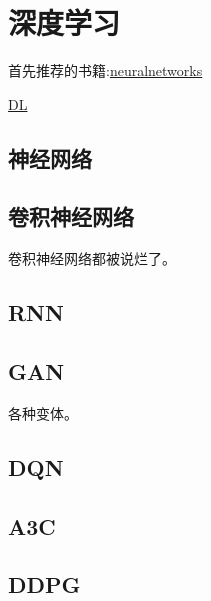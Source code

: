 \chapter{深度学习}
\label{chap:dl}
首先推荐的书籍:\href{http://neuralnetworksanddeeplearning.com/index.html}{neuralnetworks}

\href{http://deeplearning.net/tutorial/contents.html}{DL}

\section*{神经网络}
\label{sec:DNN}

\section*{卷积神经网络}
\label{sec:CNN}
卷积神经网络都被说烂了。

\section*{RNN}
\label{sec:RNN}

\section*{GAN}
\label{sec:GAN}
各种变体。

\section*{DQN}
\label{sec:DQN}

\section*{A3C}
\label{sec:A3C}

\section*{DDPG}
\label{sec:DDPG}
\endinput